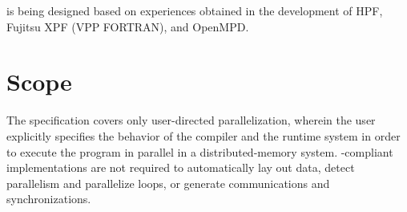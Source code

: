 \begin{itemize}
%
%
%
%
%

\end{itemize}

{\XMP} is being designed based on experiences obtained in the
development of HPF, Fujitsu XPF (VPP FORTRAN), and OpenMPD.  


\section{Scope}

The {\XMP} specification covers only user-directed parallelization,
wherein the user explicitly specifies the behavior of the compiler and
the runtime system in order to execute the program in parallel in a
distributed-memory system.
%
{\XMP}-compliant implementations are not required to automatically
lay out data, detect parallelism and parallelize loops, or generate
communications and synchronizations.

%


